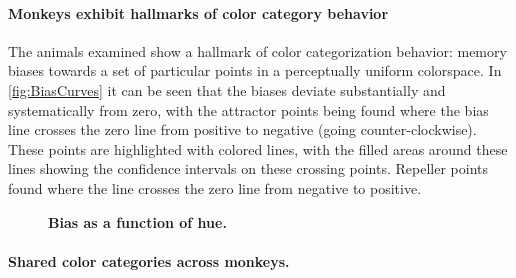 
\paragraph{Monkeys exhibit hallmarks of color category behavior}

The animals examined show a hallmark of color categorization behavior: memory biases towards a set of particular points in a perceptually uniform colorspace.
In \autoref{fig:BiasCurves} it can be seen that the biases deviate substantially and systematically from zero, with the attractor points being found where the bias line crosses the zero line from positive to negative (going counter-clockwise). These points are highlighted with colored lines, with the filled areas around these lines showing the confidence intervals on these crossing points. Repeller points found where the line crosses the zero line from negative to positive.

\begin{figure}

\caption{\textbf{Bias as a function of hue.} 
}
\label{fig:BiasCurves}
\end{figure}


\paragraph{Shared color categories across monkeys.}

